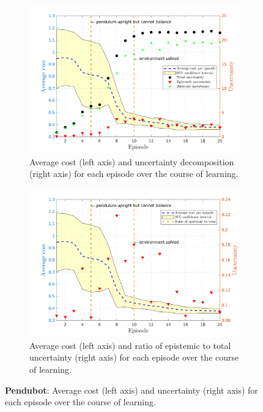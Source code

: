 \begin{figure}[htp!]    
   \begin{subfigure}[b]{1\linewidth}
    \centering
    \includegraphics[height=0.4\textheight,width=1\textwidth]{Chapter3/Figures/pen_uncertainty.png} 
    \caption{Average cost (left axis) and uncertainty decomposition (right axis) for each episode over the course of learning.} 
    \label{Fig:Re-pen-uncertainty} 
  \end{subfigure}
  \hspace{\fill}
  \begin{subfigure}[b]{1\linewidth}
    \centering
    \includegraphics[height=0.4\textheight,width=1\textwidth]{Chapter3/Figures/pen_uncertainty_norm.png} 
    \caption{Average cost (left axis) and ratio of epistemic to total uncertainty (right axis) for each episode over the course of learning.} 
    \label{Fig:Re-pen-uncertainty-norm} 
  \end{subfigure} 
\caption[Uncertainty decomposition for \textbf{pendubot} environment]{\textbf{Pendubot}: Average cost (left axis) and uncertainty (right axis) for each episode over the course of learning.}
\label{Fig:Re-pen-full-uncertainty} 
\end{figure}


